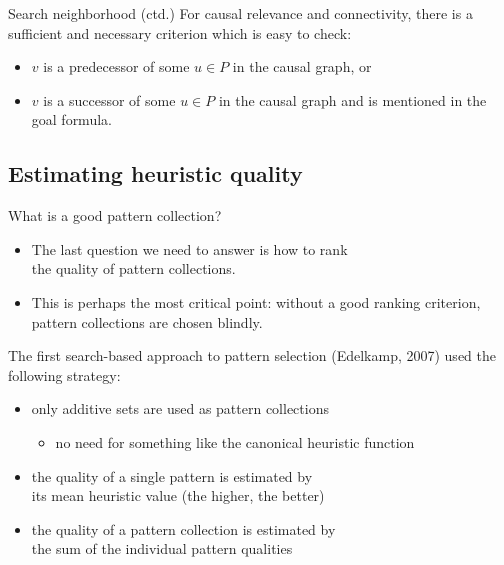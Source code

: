 \documentclass{gkibeamer}
\begin{document}
\begin{frame}{Search neighborhood (ctd.)}
   For causal relevance and connectivity, there is
  a sufficient and necessary criterion which is easy to check:
  \begin{itemize}
  \item $v$ is a predecessor of some $u \in P$ in the causal graph,
    \alert{or}
  \item $v$ is a successor of some $u \in P$ in the causal graph and
    is mentioned in the goal formula.
  \end{itemize}
\end{frame}

\subsection{Estimating heuristic quality}

\begin{frame}{What is a good pattern collection?}
  \begin{itemize}
  \item The last question we need to answer is \alert{how to rank} \\
    the quality of pattern collections.
  \item This is perhaps the most critical point: without a good
    ranking criterion, pattern collections are chosen blindly.
  \end{itemize}
  \medskip

  The first search-based approach to pattern selection (Edelkamp,
  2007) used the following strategy:
  \begin{itemize}
  \item only additive sets are used as pattern collections
    \begin{itemize}
    \item no need for something like the canonical heuristic function
    \end{itemize}
  \item the quality of a \alert{single pattern} is estimated by \\
    its \alert{mean heuristic value} (the higher, the better)
  \item the quality of a \alert{pattern collection} is estimated by \\
    the \alert{sum} of the individual pattern qualities
  \end{itemize}
\end{frame}
\end{document}
